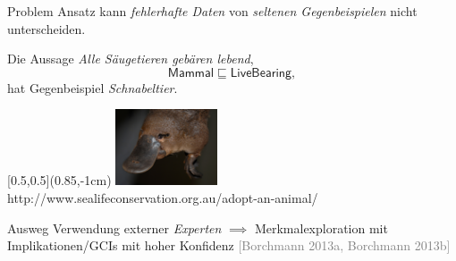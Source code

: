 \documentclass[ngerman]{beamer}
\newcommand{\pseudocite}[1]{\textcolor{gray}{[#1]}}
\begin{document}


\begin{frame}

  \onslide<+->

  \begin{block}{Problem}
    Ansatz kann \emph{fehlerhafte Daten} von \emph{seltenen Gegenbeispielen} nicht
    unterscheiden.
  \end{block}

  \onslide<+->

  \begin{Beispiel}
    Die Aussage \emph{Alle Säugetieren gebären lebend},
    \begin{equation*}
      \mathsf{Mammal} \sqsubseteq \mathsf{LiveBearing},
    \end{equation*}
    \onslide<+->
    hat Gegenbeispiel \emph{Schnabeltier}.
  
    \begin{textblock*}{\linewidth}[0.5,0.5](0.85\linewidth,-1cm)
      \centering
      \includegraphics[width=3cm]{platypus}\\[-2ex]
      {\fontsize{3pt}{4pt}\selectfont http://www.sealifeconservation.org.au/adopt-an-animal/}
    \end{textblock*}

  \end{Beispiel}

  \onslide<+->

  \begin{block}{Ausweg}
    Verwendung externer \emph{Experten}%
    \onslide<+->%
    $\implies$ Merkmalexploration mit Implikationen/GCIs mit hoher Konfidenz
    \pseudocite{Borchmann 2013a, Borchmann 2013b}
  \end{block}

\end{frame}
\end{document}
